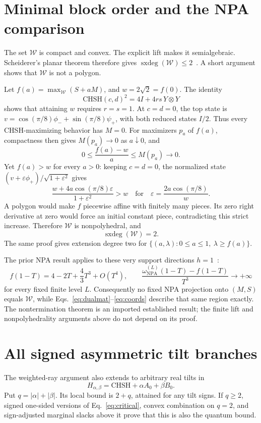 \documentclass[11pt]{article}
\newcommand{\W}{\mathcal W}
\newcommand{\sxdeg}{\operatorname{sxdeg}}
\begin{document}
\section{Minimal block order and the NPA comparison}

The set \(\W\) is compact and convex. The explicit lift makes it semialgebraic.
Scheiderer's planar theorem therefore gives \(\sxdeg(\W)\le2\)~\cite{soc}.
A short argument shows that \(\W\) is not a polygon.

Let \(f(a)=\max_{\W}(S+aM)\), and \(w=2\sqrt2=f(0)\).
The identity
\[
 \mathrm{CHSH}(c,d)^2=4I+4rs\,Y\otimes Y
\]
shows that attaining \(w\) requires \(r=s=1\).
At \(c=d=0\), the top state is
\(v=\cos(\pi/8)\phi_-+\sin(\pi/8)\psi_+\), with both reduced states \(I/2\).
Thus every CHSH-maximizing behavior has \(M=0\).
For maximizers \(p_a\) of \(f(a)\), compactness then gives \(M(p_a)\to0\) as
\(a\downarrow0\), and
\[
 0\le\frac{f(a)-w}{a}\le M(p_a)\longrightarrow0.
\]
Yet \(f(a)>w\) for every \(a>0\): keeping \(c=d=0\), the normalized state
\((v+\varepsilon\phi_+)/\sqrt{1+\varepsilon^2}\) gives
\[
 \frac{w+4a\cos(\pi/8)\varepsilon}{1+\varepsilon^2}>w
 \quad\text{for}\quad \varepsilon=\frac{2a\cos(\pi/8)}w .
\]
A polygon would make \(f\) piecewise affine with finitely many pieces.
Its zero right derivative at zero would force an initial constant piece,
contradicting this strict increase. Therefore \(\W\) is nonpolyhedral, and
\[
 \boxed{\sxdeg(\W)=2.}
\]
The same proof gives extension degree two for
\(\{(a,\lambda):0\le a\le1,\ \lambda\ge f(a)\}\).

The prior NPA result applies to these very support directions \(h=1\)~\cite{prior}:
\[
 f(1-T)=4-2T+\frac43T^3+O(T^4),\qquad
 \frac{\omega_{\mathrm{NPA}}^{(L)}(1-T)-f(1-T)}{T^3}\longrightarrow+\infty
\]
for every fixed finite level \(L\).
Consequently no fixed NPA projection onto \((M,S)\) equals \(\W\), while
Eqs.~\eqref{eq:dualmat}--\eqref{eq:coords} describe that same region exactly.
The nontermination theorem is an imported established result; the finite lift
and nonpolyhedrality arguments above do not depend on its proof.

\section{All signed asymmetric tilt branches}

The weighted-ray argument also extends to arbitrary real tilts in
\[
 H_{\alpha,\beta}=\mathrm{CHSH}+\alpha A_0+\beta B_0.
\]
Put \(q=|\alpha|+|\beta|\). Its local bound is \(2+q\), attained for any tilt
signs. If \(q\ge2\), signed one-sided versions of Eq.~\eqref{eq:critical},
convex combination on \(q=2\), and sign-adjusted marginal slacks above it prove
that this is also the quantum bound.
\end{document}
